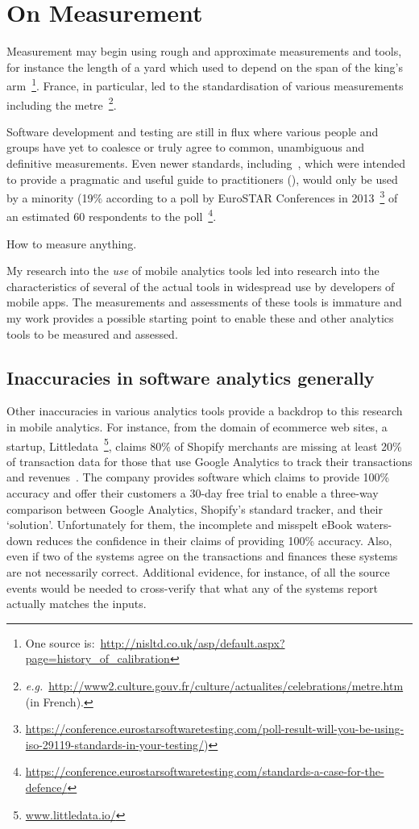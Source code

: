 \section{On Measurement}
Measurement may begin using rough and approximate measurements and tools, for instance the length of a yard which used to depend on the span of the king's arm~\footnote{One source is:~\url{http://nisltd.co.uk/asp/default.aspx?page=history_of_calibration}}. France, in particular, led to the standardisation of various measurements including the metre~\footnote{\emph{e.g.}~\url{http://www2.culture.gouv.fr/culture/actualites/celebrations/metre.htm} (in French).}.

Software development and testing are still in flux where various people and groups have yet to coalesce or truly agree to common, unambiguous and definitive measurements. Even newer standards, including~\cite{iso29119-1-2013}, which were intended to provide a pragmatic and useful guide to practitioners (\cite{reid2012_iso29119_eurostar}), would only be used by a minority (19\% according to a poll by EuroSTAR Conferences in 2013~\footnote{\url{https://conference.eurostarsoftwaretesting.com/poll-result-will-you-be-using-iso-29119-standards-in-your-testing/})} of an estimated 60 respondents to the poll~\footnote{\url{https://conference.eurostarsoftwaretesting.com/standards-a-case-for-the-defence/}}.

How to measure anything. 

My research into the \emph{use} of mobile analytics tools led into research into the characteristics of several of the actual tools in widespread use by developers of mobile apps. The measurements and assessments of these tools is immature and my work provides a possible starting point to enable these and other analytics tools to be measured and assessed.

\subsection{Inaccuracies in software analytics generally}
Other inaccuracies in various analytics tools provide a backdrop to this research in mobile analytics. For instance, from the domain of ecommerce web sites, a startup, Littledata~\footnote{\href{https://www.littledata.io/}{www.littledata.io/}}, claims 80\% of Shopify merchants are missing at least 20\% of transaction data for those that use Google Analytics to track their transactions and revenues~\citep{littledata2020_google_analytics_doesnt_match_shopify}. The company provides software which claims to provide 100\% accuracy and offer their customers a 30-day free trial to enable a three-way comparison between Google Analytics, Shopify's standard tracker, and their `solution'. Unfortunately for them, the incomplete and misspelt eBook waters-down reduces the confidence in their claims of providing 100\% accuracy. Also, even if two of the systems agree on the transactions and finances these systems are not necessarily correct. Additional evidence, for instance, of all the source events would be needed to cross-verify that what any of the systems report actually matches the inputs.

